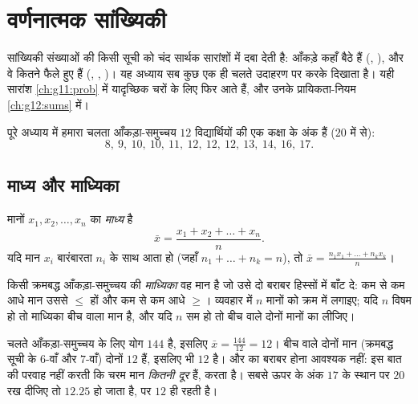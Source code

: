 \chapter{वर्णनात्मक सांख्यिकी}\label{ch:g11:stat}

सांख्यिकी संख्याओं की किसी सूची को चंद सार्थक सारांशों में दबा देती है:
आँकड़े कहाँ बैठे हैं (, ), और वे कितने फैले हुए हैं (,
, )। यह अध्याय सब कुछ एक ही चलते उदाहरण पर करके दिखाता है।
यही सारांश \cref{ch:g11:prob} में यादृच्छिक चरों के लिए फिर आते हैं, और उनके प्रायिकता-नियम
\cref{ch:g12:sums} में।

पूरे अध्याय में हमारा चलता आँकड़ा-समुच्चय $12$ विद्यार्थियों की एक कक्षा के
अंक हैं ($20$ में से):
\[
8,\ 9,\ 10,\ 10,\ 11,\ 12,\ 12,\ 12,\ 13,\ 14,\ 16,\ 17 .
\]

\section{माध्य और माध्यिका}

\begin{definition}[माध्य]\label{def:g11:stat:mean}
मानों $x_1, x_2, \dots, x_n$ का \emph{माध्य} है
\[
\bar x = \frac{x_1 + x_2 + \dots + x_n}{n}.
\]
यदि मान $x_i$ बारंबारता $n_i$ के साथ आता हो (जहाँ $n_1 + \dots + n_k = n$), तो $\bar x = \frac{n_1 x_1 + \dots + n_k x_k}{n}$।
\end{definition}

\begin{definition}[माध्यिका]\label{def:g11:stat:median}
किसी क्रमबद्ध आँकड़ा-समुच्चय की \emph{माध्यिका} वह मान है जो
उसे दो बराबर हिस्सों में बाँट दे: कम से कम आधे मान उससे $\leq$ हों और कम से कम
आधे $\geq$। व्यवहार में $n$ मानों को क्रम में लगाइए; यदि $n$ विषम हो तो
माध्यिका बीच वाला मान है, और यदि $n$ सम हो तो बीच वाले दोनों मानों का
 लीजिए।
\end{definition}

\begin{example}\label{ex:g11:stat:meanmedian}
चलते आँकड़ा-समुच्चय के लिए योग $144$ है, इसलिए $\bar x = \frac{144}{12} =
12$। बीच वाले दोनों मान
(क्रमबद्ध सूची के $6$-वाँ और $7$-वाँ) दोनों $12$ हैं, इसलिए  भी
$12$ है।  और  का बराबर होना आवश्यक नहीं:  इस बात की
परवाह नहीं करती कि चरम मान \emph{कितनी दूर} हैं,  करता है। सबसे ऊपर के
अंक $17$ के स्थान पर $20$ रख दीजिए तो  $12.25$ हो जाता है, पर 
$12$ ही रहती है।
\end{example}

